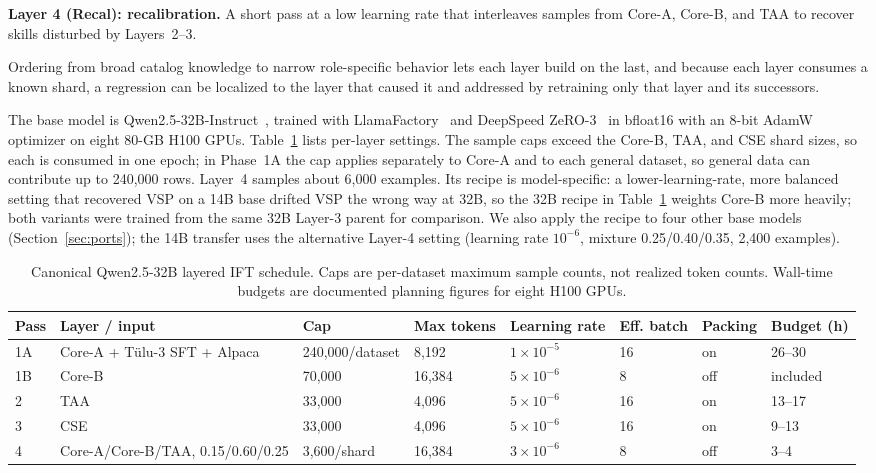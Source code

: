 \documentclass[conference]{IEEEtran}
\begin{document}
\textbf{Layer 4 (Recal): recalibration.} A short pass at a low learning rate that interleaves samples from Core-A, Core-B, and TAA to recover skills disturbed by Layers~2--3.

Ordering from broad catalog knowledge to narrow role-specific behavior lets each layer build on the last, and because each layer consumes a known shard, a regression can be localized to the layer that caused it and addressed by retraining only that layer and its successors.

The base model is Qwen2.5-32B-Instruct~\cite{qwen25}, trained with LlamaFactory~\cite{zheng2024llamafactory} and DeepSpeed ZeRO-3~\cite{rajbhandari2020zero} in bfloat16 with an 8-bit AdamW optimizer on eight 80-GB H100 GPUs. Table~\ref{tab:train} lists per-layer settings. The sample caps exceed the Core-B, TAA, and CSE shard sizes, so each is consumed in one epoch; in Phase~1A the cap applies separately to Core-A and to each general dataset, so general data can contribute up to 240,000 rows. Layer~4 samples about 6,000 examples. Its recipe is model-specific: a lower-learning-rate, more balanced setting that recovered VSP on a 14B base drifted VSP the wrong way at 32B, so the 32B recipe in Table~\ref{tab:train} weights Core-B more heavily; both variants were trained from the same 32B Layer-3 parent for comparison. We also apply the recipe to four other base models (Section~\ref{sec:ports}); the 14B transfer uses the alternative Layer-4 setting (learning rate $10^{-6}$, mixture 0.25/0.40/0.35, 2,400 examples).

\begin{table}[t]
\caption{Canonical Qwen2.5-32B layered IFT schedule. Caps are per-dataset maximum sample counts, not realized token counts. Wall-time budgets are documented planning figures for eight H100 GPUs.}
\label{tab:train}
\centering
\scriptsize
\setlength{\tabcolsep}{3.2pt}
\begin{tabular}{@{}llllllll@{}}
\toprule
Pass & Layer / input & Cap & Max tokens & Learning rate & Eff. batch & Packing & Budget (h) \\
\midrule
1A & Core-A + T\"ulu-3 SFT + Alpaca & 240,000/dataset & 8,192 & $1\times10^{-5}$ & 16 & on & 26--30 \\
1B & Core-B & 70,000 & 16,384 & $5\times10^{-6}$ & 8 & off & included \\
2 & TAA & 33,000 & 4,096 & $5\times10^{-6}$ & 16 & on & 13--17 \\
3 & CSE & 33,000 & 4,096 & $5\times10^{-6}$ & 16 & on & 9--13 \\
4 & Core-A/Core-B/TAA, 0.15/0.60/0.25 & 3,600/shard & 16,384 & $3\times10^{-6}$ & 8 & off & 3--4 \\
\bottomrule
\end{tabular}
\end{table}
\end{document}
